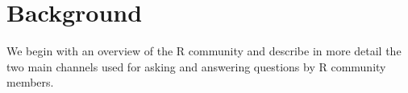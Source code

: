 \section{Background}
\label{cha:background}
We begin with an overview of the R community and describe in more detail the two main channels used for asking and answering questions by R community members.





